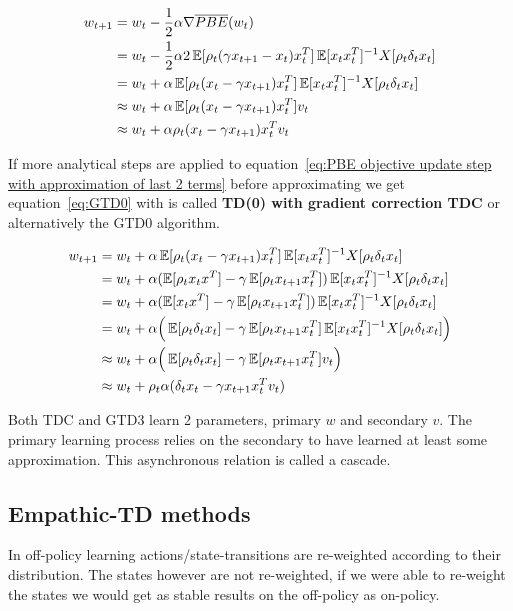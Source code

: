 \begin{equation}
\begin{split}
w_{t+1} &= w_t - \frac{1}{2}\alpha\nabla\overline{PBE}(w_t) \\
&= w_t - \frac{1}{2}\alpha 2\operatorname{\mathbb{E}}[\rho_t(\gamma x_{t+1}-x_t)x^T_t]\operatorname{\mathbb{E}}[x_tx_t^T]^{-1}X[\rho_t\delta_tx_t] \\
&= w_t + \alpha\operatorname{\mathbb{E}}[\rho_t(x_t - \gamma x_{t+1})x^T_t]\operatorname{\mathbb{E}}[x_tx_t^T]^{-1}X[\rho_t\delta_tx_t] \\
&\approx w_t + \alpha \operatorname{\mathbb{E}}[\rho_t(x_t - \gamma x_{t+1})x^T_t] v_t \\
&\approx w_t + \alpha \rho_t (x_t - \gamma x_{t+1})x_t^Tv_t
\label{eq:PBE objective update step with approximation of last 2 terms}
\end{split}
\end{equation}

If more analytical steps are applied to equation~\ref{eq:PBE objective update step with approximation of last 2 terms} before approximating we get equation~\ref{eq:GTD0} with is called \textbf{TD(0) with gradient correction TDC} or alternatively the GTD0 algorithm.

\begin{equation}
\begin{split}
w_{t+1}&= w_t + \alpha\operatorname{\mathbb{E}}[\rho_t(x_t - \gamma x_{t+1})x^T_t]\operatorname{\mathbb{E}}[x_tx_t^T]^{-1}X[\rho_t\delta_tx_t] \\
&= w_t + \alpha(\operatorname{\mathbb{E}}[\rho_tx_tx^T] - \gamma\operatorname{\mathbb{E}}[\rho_t x_{t+1}x^T_t])\operatorname{\mathbb{E}}[x_tx_t^T]^{-1}X[\rho_t\delta_tx_t] \\
&= w_t + \alpha(\operatorname{\mathbb{E}}[x_tx^T] - \gamma\operatorname{\mathbb{E}}[\rho_t x_{t+1}x^T_t])\operatorname{\mathbb{E}}[x_tx_t^T]^{-1}X[\rho_t\delta_tx_t] \\
&= w_t + \alpha\Big(\operatorname{\mathbb{E}}[\rho_t\delta_tx_t] - \gamma\operatorname{\mathbb{E}}[\rho_t x_{t+1}x^T_t]\operatorname{\mathbb{E}}[x_tx_t^T]^{-1}X[\rho_t\delta_tx_t]\Big) \\
&\approx w_t + \alpha\Big(\operatorname{\mathbb{E}}[\rho_t\delta_tx_t] - \gamma\operatorname{\mathbb{E}}[\rho_t x_{t+1}x^T_t] v_t \Big) \\
&\approx w_t + \rho_t\alpha(\delta_tx_t - \gamma x_{t+1}x^T_t v_t )
\end{split}
\label{eq:GTD0}
\end{equation}

Both TDC and GTD3 learn 2 parameters, primary $w$ and secondary $v$. The primary learning process relies on the secondary to have learned at least some approximation. This asynchronous relation is called a cascade.

\subsection{Empathic-TD methods}
In off-policy learning actions/state-transitions are re-weighted according to their distribution. The states however are not re-weighted, if we were able to re-weight the states we would get as stable results on the off-policy as on-policy.

